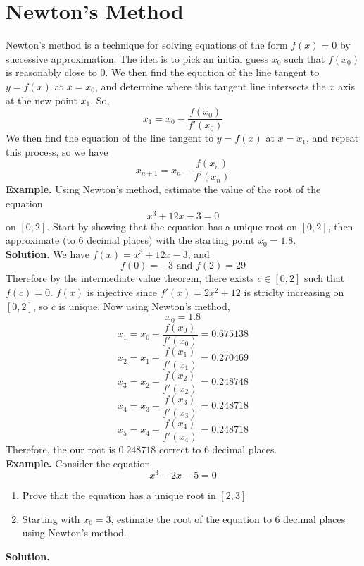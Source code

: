 \documentclass[openany]{report}
\begin{document}
\section{Newton's Method}
Newton's method is a technique for solving equations of the form $f(x) = 0$ by successive approximation. The idea is to pick an initial guess $x_0$ such that $f(x_0)$ is reasonably close to 0. We then find the equation of the line tangent to $y = f(x)$ at $x = x_0$, and determine where this tangent line intersects the $x$ axis at the new point $x_1$. So, 
\[x_1 = x_0 - \frac{f(x_0)}{f'(x_0)}\]
We then find the equation of the line tangent to $y = f(x)$ at $x = x_1$, and repeat this process, so we have 
\[x_{n+1} = x_n - \frac{f(x_n)}{f'(x_n)}\]
\textbf{Example.} Using Newton's method, estimate the value of the root of the equation 
\[x^3 + 12x - 3 = 0\]
on $[0,2]$. Start by showing that the equation has a unique root on $[0,2]$, then approximate (to 6 decimal places) with the starting point $x_0 = 1.8$.\\[2ex]
\textbf{Solution.} We have $f(x) = x^3 + 12x - 3$, and 
\[f(0) = -3 \text{ and } f(2) = 29\]
Therefore by the intermediate value theorem, there exists $c \in [0,2]$ such that $f(c) = 0$. $f(x)$ is injective since $f'(x) = 2x^2 + 12$ is striclty increasing on $[0,2]$, so $c$ is unique. Now using Newton's method, 
\[x_0 = 1.8\]
\[x_1 = x_0 - \frac{f(x_0)}{f'(x_0)} = 0.675138\]
\[x_2 = x_1 - \frac{f(x_1)}{f'(x_1)} = 0.270469\]
\[x_3 = x_2 - \frac{f(x_2)}{f'(x_2)} = 0.248748\]
\[x_4 = x_3 - \frac{f(x_3)}{f'(x_3)} = 0.248718\]
\[x_5 = x_4 - \frac{f(x_4)}{f'(x_4)} = 0.248718\]
Therefore, the our root is $0.248718$ correct to 6 decimal places.\\[3ex]
\textbf{Example.} Consider the equation 
\[x^3 - 2x - 5 = 0\]
\begin{enumerate}[label=(\roman*)]
    \item Prove that the equation has a unique root in $[2,3]$
    \item Starting with $x_0 = 3$, estimate the root of the equation to 6 decimal places using Newton's method.
\end{enumerate}
\textbf{Solution.} 
\end{document}
